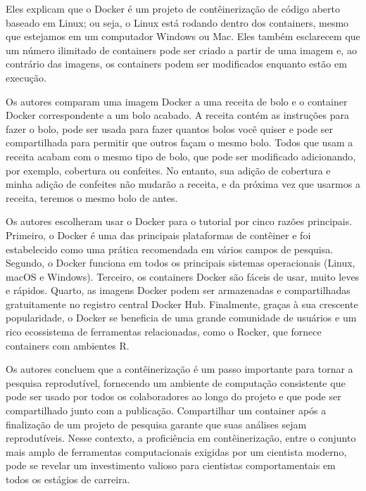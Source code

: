 \documentclass[
  a4paper,
]{book}
\begin{document}
\begin{tcolorbox}
Eles explicam que o Docker é um projeto de contêinerização de código
aberto baseado em Linux; ou seja, o Linux está rodando dentro dos
containers, mesmo que estejamos em um computador Windows ou Mac. Eles
também esclarecem que um número ilimitado de containers pode ser criado
a partir de uma imagem e, ao contrário das imagens, os containers podem
ser modificados enquanto estão em execução.\vspace{0.5em}

Os autores comparam uma imagem Docker a uma receita de bolo e o
container Docker correspondente a um bolo acabado. A receita contém as
instruções para fazer o bolo, pode ser usada para fazer quantos bolos
você quiser e pode ser compartilhada para permitir que outros façam o
mesmo bolo. Todos que usam a receita acabam com o mesmo tipo de bolo,
que pode ser modificado adicionando, por exemplo, cobertura ou
confeites. No entanto, sua adição de cobertura e minha adição de
confeites não mudarão a receita, e da próxima vez que usarmos a receita,
teremos o mesmo bolo de antes.\vspace{0.5em}

Os autores escolheram usar o Docker para o tutorial por cinco razões
principais. Primeiro, o Docker é uma das principais plataformas de
contêiner e foi estabelecido como uma prática recomendada em vários
campos de pesquisa. Segundo, o Docker funciona em todos os principais
sistemas operacionais (Linux, macOS e Windows). Terceiro, os containers
Docker são fáceis de usar, muito leves e rápidos. Quarto, as imagens
Docker podem ser armazenadas e compartilhadas gratuitamente no registro
central Docker Hub. Finalmente, graças à sua crescente popularidade, o
Docker se beneficia de uma grande comunidade de usuários e um rico
ecossistema de ferramentas relacionadas, como o Rocker, que fornece
containers com ambientes R.\vspace{0.5em}

Os autores concluem que a contêinerização é um passo importante para
tornar a pesquisa reprodutível, fornecendo um ambiente de computação
consistente que pode ser usado por todos os colaboradores ao longo do
projeto e que pode ser compartilhado junto com a publicação.
Compartilhar um container após a finalização de um projeto de pesquisa
garante que suas análises sejam reprodutíveis. Nesse contexto, a
proficiência em contêinerização, entre o conjunto mais amplo de
ferramentas computacionais exigidas por um cientista moderno, pode se
revelar um investimento valioso para cientistas comportamentais em todos
os estágios de carreira.

\end{tcolorbox}
\end{document}
